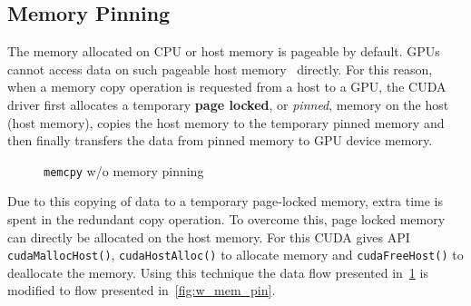 \subsection{Memory Pinning}\label{memory_pinning}
The memory allocated on CPU or host memory is pageable by default. GPUs cannot
access data on such pageable host memory~\cite{datatransferoptimization, programmingguidecuda}
directly. For this reason, when a memory copy operation is requested
from a host to a GPU, the CUDA driver first allocates a temporary \textbf{page locked},
or \textit{pinned}, memory on the host (host memory), copies the host memory to the
temporary pinned memory and then finally transfers the data from pinned memory
to GPU device memory.
\begin{figure}[h] %
  \caption{\texttt{memcpy} w/o memory pinning}\label{fig:wo_mem_pin}
\end{figure}

Due to this copying of data to a temporary page-locked memory, extra time
is spent in the redundant copy operation. To overcome this, page locked memory
can directly be allocated on the host memory. For this CUDA gives API \texttt{cudaMallocHost()},
\texttt{cudaHostAlloc()} to allocate memory and \texttt{cudaFreeHost()} to deallocate
the memory. Using this technique the data flow presented in~\ref{fig:wo_mem_pin} is
modified to flow presented in~\ref{fig:w_mem_pin}.

